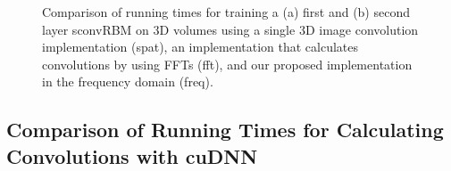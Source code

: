 \begin{figure}[t!]

\caption[Comparison of running times for training a sconvRBMs on 3D
images]{Comparison of running times for training a (a) first and (b) second
layer sconvRBM on 3D volumes using a single 3D image convolution implementation
(spat), an implementation that calculates convolutions by using FFTs (fft), and
our proposed implementation in the frequency domain (freq).}
\label{fig:run_oasis}
\end{figure}

\subsection{Comparison of Running Times for Calculating Convolutions with cuDNN}


